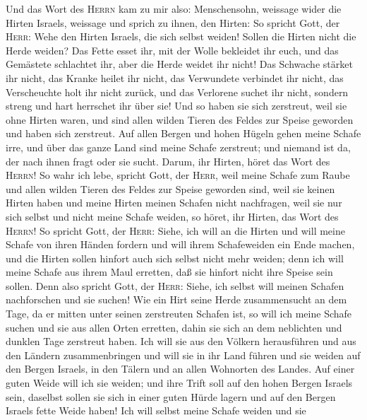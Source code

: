  Und das Wort des \textsc{Herrn} kam zu mir also:
 Menschensohn, weissage wider die Hirten Israels, weissage
und sprich zu ihnen, den Hirten: So spricht Gott, der \textsc{Herr}:
Wehe den Hirten Israels, die sich selbst weiden! Sollen die Hirten nicht
die Herde weiden?  Das Fette esset ihr, mit der Wolle
bekleidet ihr euch, und das Gemästete schlachtet ihr, aber die Herde
weidet ihr nicht!  Das Schwache stärket ihr nicht, das
Kranke heilet ihr nicht, das Verwundete verbindet ihr nicht, das
Verscheuchte holt ihr nicht zurück, und das Verlorene suchet ihr nicht,
 sondern streng und hart herrschet ihr über sie! Und so
haben sie sich zerstreut, weil sie ohne Hirten waren, und sind allen
wilden Tieren des Feldes zur Speise geworden und haben sich zerstreut.
 Auf allen Bergen und hohen Hügeln gehen meine Schafe
irre, und über das ganze Land sind meine Schafe zerstreut; und niemand
ist da, der nach ihnen fragt oder sie sucht.  Darum, ihr
Hirten, höret das Wort des \textsc{Herrn}!  So wahr ich
lebe, spricht Gott, der \textsc{Herr}, weil meine Schafe zum Raube und
allen wilden Tieren des Feldes zur Speise geworden sind, weil sie keinen
Hirten haben und meine Hirten meinen Schafen nicht nachfragen, weil sie
nur sich selbst und nicht meine Schafe weiden,  so höret,
ihr Hirten, das Wort des \textsc{Herrn}!  So spricht
Gott, der \textsc{Herr}: Siehe, ich will an die Hirten und will meine
Schafe von ihren Händen fordern und will ihrem Schafeweiden ein Ende
machen, und die Hirten sollen hinfort auch sich selbst nicht mehr
weiden; denn ich will meine Schafe aus ihrem Maul erretten, daß sie
hinfort nicht ihre Speise sein sollen.  Denn also spricht
Gott, der \textsc{Herr}: Siehe, ich selbst will meinen Schafen
nachforschen und sie suchen!  Wie ein Hirt seine Herde
zusammensucht an dem Tage, da er mitten unter seinen zerstreuten Schafen
ist, so will ich meine Schafe suchen und sie aus allen Orten erretten,
dahin sie sich an dem neblichten und dunklen Tage zerstreut haben.
 Ich will sie aus den Völkern herausführen und aus den
Ländern zusammenbringen und will sie in ihr Land führen und sie weiden
auf den Bergen Israels, in den Tälern und an allen Wohnorten des Landes.
 Auf einer guten Weide will ich sie weiden; und ihre
Trift soll auf den hohen Bergen Israels sein, daselbst sollen sie sich
in einer guten Hürde lagern und auf den Bergen Israels fette Weide
haben!  Ich will selbst meine Schafe weiden und sie

